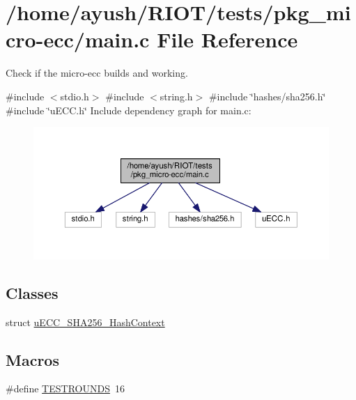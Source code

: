 \hypertarget{pkg__micro-ecc_2main_8c}{}\section{/home/ayush/\+R\+I\+O\+T/tests/pkg\+\_\+micro-\/ecc/main.c File Reference}
\label{pkg__micro-ecc_2main_8c}


Check if the micro-\/ecc builds and working.  


{\ttfamily \#include $<$stdio.\+h$>$}\newline
{\ttfamily \#include $<$string.\+h$>$}\newline
{\ttfamily \#include \char`\"{}hashes/sha256.\+h\char`\"{}}\newline
{\ttfamily \#include \char`\"{}u\+E\+C\+C.\+h\char`\"{}}\newline
Include dependency graph for main.\+c\+:
\nopagebreak
\begin{figure}[H]
\begin{center}
\leavevmode
\includegraphics[width=350pt]{pkg__micro-ecc_2main_8c__incl}
\end{center}
\end{figure}
\subsection*{Classes}
\begin{DoxyCompactItemize}
\item 
struct \hyperlink{structuECC__SHA256__HashContext}{u\+E\+C\+C\+\_\+\+S\+H\+A256\+\_\+\+Hash\+Context}
\end{DoxyCompactItemize}
\subsection*{Macros}
\begin{DoxyCompactItemize}
\item 
\#define \hyperlink{pkg__micro-ecc_2main_8c_af923d96bdee3816363ed1cc4b7c82ad2}{T\+E\+S\+T\+R\+O\+U\+N\+DS}~16
\end{DoxyCompactItemize}
